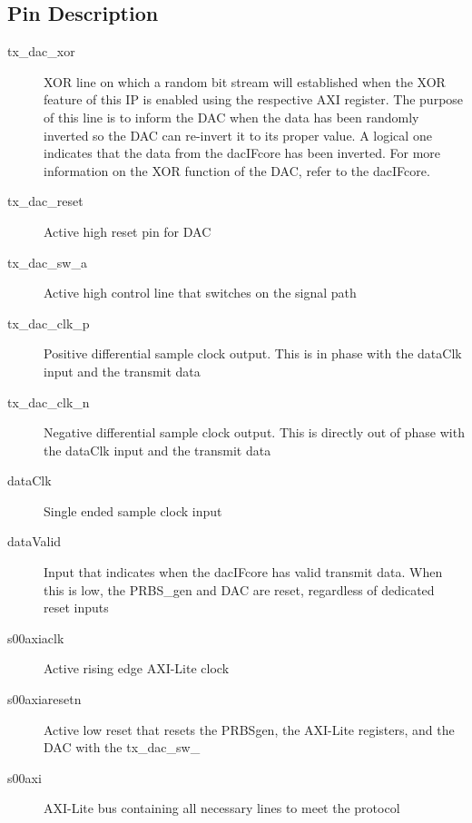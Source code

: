 \documentclass[11pt]{article}
\begin{document}
\subsection{Pin Description}
\begin{description}
	\item[tx\_{}dac\_{}xor]XOR line on which a random bit stream will established when the XOR feature of this IP is enabled using the respective AXI
		register. The purpose of this line is to inform the DAC when the data has been randomly inverted so the DAC can re-invert it to its proper value.
		A logical one indicates that the data from the dac\textunderscore IF\textunderscore core has been inverted.
		For more information on the XOR function of the DAC, refer to the dac\textunderscore IF\textunderscore core.
	\item[tx\_{}dac\_{}reset]Active high reset pin for DAC
	\item[tx\_{}dac\_{}sw\_{}a]Active high control line that switches on the signal path
	\item[tx\_{}dac\_{}clk\_{}p]Positive differential sample clock output. This is in phase with the dataClk input and the transmit data
	\item[tx\_{}dac\_{}clk\_{}n]Negative differential sample clock output. This is directly out of phase with the dataClk input and the transmit data
	\item[dataClk]Single ended sample clock input
	\item[dataValid]Input that indicates when the dac\textunderscore IF\textunderscore core has valid transmit data. When this is low, the PRBS\_{}gen and
		DAC are reset, regardless of dedicated reset inputs
	\item[s00\textunderscore axi\textunderscore aclk]Active rising edge AXI-Lite clock
	\item[s00\textunderscore axi\textunderscore aresetn]Active low reset that resets the PRBS\textunderscore gen, the AXI-Lite registers, and the DAC
		with the tx\_{}dac\_{}sw\_{}
	\item[s00\textunderscore axi]AXI-Lite bus containing all necessary lines to meet the protocol
\end{description}
\end{document}
